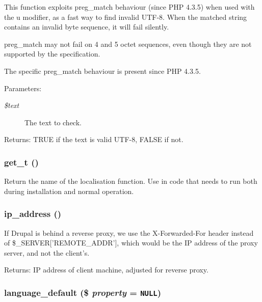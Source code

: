 This function exploits preg\_\-match behaviour (since PHP 4.3.5) when used with the u modifier, as a fast way to find invalid UTF-8. When the matched string contains an invalid byte sequence, it will fail silently.

preg\_\-match may not fail on 4 and 5 octet sequences, even though they are not supported by the specification.

The specific preg\_\-match behaviour is present since PHP 4.3.5.

\begin{Desc}
\item[Parameters:]
\begin{description}
\item[{\em \$text}]The text to check. \end{description}
\end{Desc}
\begin{Desc}
\item[Returns:]TRUE if the text is valid UTF-8, FALSE if not. \end{Desc}
\hypertarget{bootstrap_8inc_a50232f577883a48731fc93530628a79}{
\subsubsection[{get\_\-t}]{\setlength{\rightskip}{0pt plus 5cm}get\_\-t ()}}
\label{bootstrap_8inc_a50232f577883a48731fc93530628a79}


Return the name of the localisation function. Use in code that needs to run both during installation and normal operation. \hypertarget{bootstrap_8inc_ec2f772317b4fb79cc696412c2e455c3}{
\subsubsection[{ip\_\-address}]{\setlength{\rightskip}{0pt plus 5cm}ip\_\-address ()}}
\label{bootstrap_8inc_ec2f772317b4fb79cc696412c2e455c3}


If Drupal is behind a reverse proxy, we use the X-Forwarded-For header instead of \$\_\-SERVER\mbox{[}'REMOTE\_\-ADDR'\mbox{]}, which would be the IP address of the proxy server, and not the client's.

\begin{Desc}
\item[Returns:]IP address of client machine, adjusted for reverse proxy. \end{Desc}
\hypertarget{bootstrap_8inc_336c0878074791056c62640cd95d8067}{
\subsubsection[{language\_\-default}]{\setlength{\rightskip}{0pt plus 5cm}language\_\-default (\$ {\em property} = {\tt NULL})}}
\label{bootstrap_8inc_336c0878074791056c62640cd95d8067}


